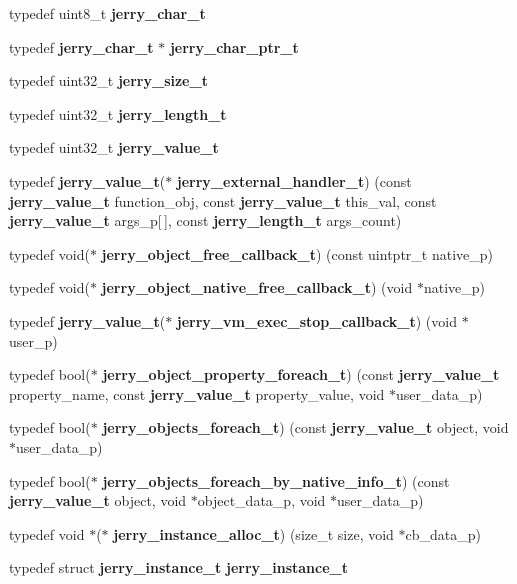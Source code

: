 \begin{DoxyCompactItemize}
\item 
typedef uint8\+\_\+t \textbf{ jerry\+\_\+char\+\_\+t}
\item 
typedef \textbf{ jerry\+\_\+char\+\_\+t} $\ast$ \textbf{ jerry\+\_\+char\+\_\+ptr\+\_\+t}
\item 
typedef uint32\+\_\+t \textbf{ jerry\+\_\+size\+\_\+t}
\item 
typedef uint32\+\_\+t \textbf{ jerry\+\_\+length\+\_\+t}
\item 
typedef uint32\+\_\+t \textbf{ jerry\+\_\+value\+\_\+t}
\item 
typedef \textbf{ jerry\+\_\+value\+\_\+t}($\ast$ \textbf{ jerry\+\_\+external\+\_\+handler\+\_\+t}) (const \textbf{ jerry\+\_\+value\+\_\+t} function\+\_\+obj, const \textbf{ jerry\+\_\+value\+\_\+t} this\+\_\+val, const \textbf{ jerry\+\_\+value\+\_\+t} args\+\_\+p[$\,$], const \textbf{ jerry\+\_\+length\+\_\+t} args\+\_\+count)
\item 
typedef void($\ast$ \textbf{ jerry\+\_\+object\+\_\+free\+\_\+callback\+\_\+t}) (const uintptr\+\_\+t native\+\_\+p)
\item 
typedef void($\ast$ \textbf{ jerry\+\_\+object\+\_\+native\+\_\+free\+\_\+callback\+\_\+t}) (void $\ast$native\+\_\+p)
\item 
typedef \textbf{ jerry\+\_\+value\+\_\+t}($\ast$ \textbf{ jerry\+\_\+vm\+\_\+exec\+\_\+stop\+\_\+callback\+\_\+t}) (void $\ast$user\+\_\+p)
\item 
typedef bool($\ast$ \textbf{ jerry\+\_\+object\+\_\+property\+\_\+foreach\+\_\+t}) (const \textbf{ jerry\+\_\+value\+\_\+t} property\+\_\+name, const \textbf{ jerry\+\_\+value\+\_\+t} property\+\_\+value, void $\ast$user\+\_\+data\+\_\+p)
\item 
typedef bool($\ast$ \textbf{ jerry\+\_\+objects\+\_\+foreach\+\_\+t}) (const \textbf{ jerry\+\_\+value\+\_\+t} object, void $\ast$user\+\_\+data\+\_\+p)
\item 
typedef bool($\ast$ \textbf{ jerry\+\_\+objects\+\_\+foreach\+\_\+by\+\_\+native\+\_\+info\+\_\+t}) (const \textbf{ jerry\+\_\+value\+\_\+t} object, void $\ast$object\+\_\+data\+\_\+p, void $\ast$user\+\_\+data\+\_\+p)
\item 
typedef void $\ast$($\ast$ \textbf{ jerry\+\_\+instance\+\_\+alloc\+\_\+t}) (size\+\_\+t size, void $\ast$cb\+\_\+data\+\_\+p)
\item 
typedef struct \textbf{ jerry\+\_\+instance\+\_\+t} \textbf{ jerry\+\_\+instance\+\_\+t}
\end{DoxyCompactItemize}
